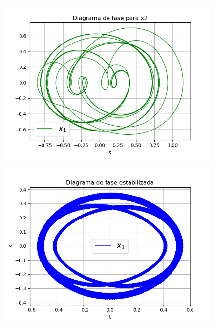 \documentclass{article}
\begin{document}
\begin{figure}[H]
\centering
\includegraphics[scale=0.59]{41_f2.png}
\end{figure}

\begin{figure}[H]
\centering
\includegraphics[scale=0.59]{41_fe1.png}
\end{figure}
\end{document}
